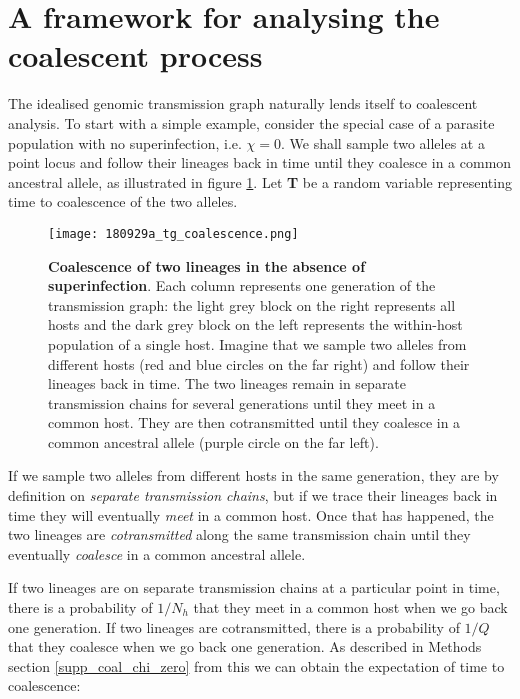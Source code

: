 \documentclass[_main.tex]{subfiles}
\begin{document}
\section*{A framework for analysing the coalescent process}  
\label{main_coalescent}

The idealised genomic transmission graph naturally lends itself to coalescent analysis.  To start with a simple example, consider the special case of a parasite population with no superinfection, i.e. $\chi =0$.  We shall sample two alleles at a point locus and follow their lineages back in time until they coalesce in a common ancestral allele, as illustrated in figure \ref{fig:coalescent}.  Let \textbf{T} be a random variable representing time to coalescence of the two alleles.

\begin{figure}[h!]
\centering
\texttt{[image: 180929a\_tg\_coalescence.png]}
\caption{\textbf{Coalescence of two lineages in the absence of superinfection}. Each column represents one generation of the transmission graph: the light grey block on the right represents all hosts and the dark grey block on the left represents the within-host population of a single host.    Imagine that we sample two alleles from different hosts (red and blue circles on the far right) and follow their lineages back in time.  The two lineages remain in separate transmission chains for several generations until they meet in a common host.  They are then cotransmitted until they coalesce in a common ancestral allele (purple circle on the far left).}
\label{fig:coalescent}
\end{figure}

If we sample two alleles from different hosts in the same generation, they are by definition on \textit{separate transmission chains}, but if we trace their lineages back in time they will eventually \textit{meet} in a common host.  Once that has happened, the two lineages are \textit{cotransmitted} along the same transmission chain until they eventually \textit{coalesce} in a common ancestral allele. 

If two lineages are on separate transmission chains at a particular point in time, there is a probability of $1/N_h$ that they meet in a common host when we go back one generation.  If two lineages are cotransmitted, there is a probability of $1/Q$ that they coalesce when we go back one generation.  As described in Methods section \ref{supp_coal_chi_zero} from this we can obtain the expectation of time to coalescence:
\end{document}
